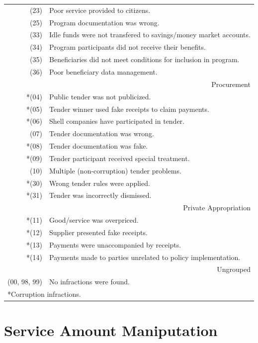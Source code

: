 \documentclass[11pt]{article}
\begin{document}
\begin{table}[!htbp]
\begin{tabular}{r|l}
   (23) & Poor service provided to citizens. \\
   (25) & Program documentation was wrong. \\
   (33) & Idle funds were not transfered to savings/money market accounts. \\
   (34) & Program participants did not receive their benefits. \\
   (35) & Beneficiaries did not meet conditions for inclusion in program. \\
   (36) & Poor beneficiary data management. \\
  \hline
  \multicolumn{2}{r}{Procurement} \\
  \hline
  *(04) & Public tender was not publicized. \\
  *(05) & Tender winner used fake receipts to claim payments. \\
  *(06) & Shell companies have participated in tender. \\
   (07) & Tender documentation was wrong. \\
  *(08) & Tender documentation was fake. \\
  *(09) & Tender participant received special treatment. \\
   (10) & Multiple (non-corruption) tender problems. \\
  *(30) & Wrong tender rules were applied. \\
  *(31) & Tender was incorrectly dismissed. \\
  \hline
  \multicolumn{2}{r}{Private Appropriation} \\
  \hline
  *(11) & Good/service was overpriced. \\
  *(12) & Supplier presented fake receipts. \\
  *(13) & Payments were unaccompanied by receipts. \\
  *(14) & Payments made to parties unrelated to policy implementation. \\
  \hline
  \multicolumn{2}{r}{Ungrouped} \\
  \hline
  (00, 98, 99) & No infractions were found. \\
  \hline

  \hline
  \multicolumn{2}{l}{*Corruption infractions.}
  \end{tabular}
\end{table}

\section{Service Amount Maniputation}\label{sec:appendixC}
\end{document}
